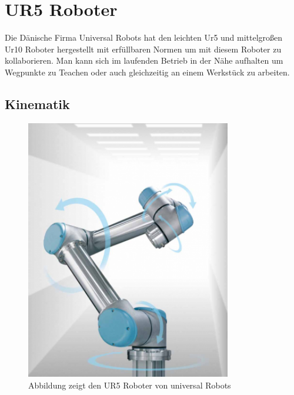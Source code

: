 \section{UR5 Roboter}
\label{sec:ur_robot_gru}

Die Dänische Firma Universal Robots hat den leichten Ur5 und mittelgroßen Ur10 Roboter hergestellt mit erfüllbaren Normen um mit diesem Roboter zu kollaborieren. Man kann sich im laufenden Betrieb in der Nähe aufhalten um Wegpunkte zu Teachen oder auch gleichzeitig an einem Werkstück zu arbeiten. 

\subsection{Kinematik}
\label{ur_eigenschaften_gru}

\begin{figure}[ht]
  \centering
    \includegraphics[width=0.8\textwidth]{pic/ur5_robot.png}
      \caption[UR5 Roboter]{Abbildung zeigt den UR5 Roboter von universal Robots}
      \label{fig:schnittstellen_schichten}
\end{figure}

